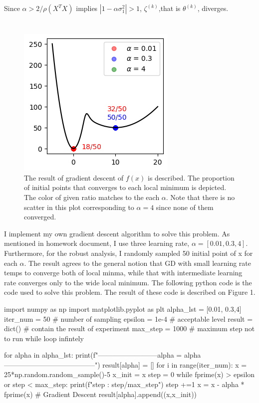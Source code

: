 \documentclass[10pt]{article}
\begin{document}
Since $\alpha > 2/\rho(X^TX)$ implies $\left|1-\alpha \sigma_1^2\right|>1$, $\zeta^{(k)}$,that is $\theta^{(k)}$, diverges.



\section{}
\begin{figure}[!ht]
    \begin{center}
        \includegraphics{Fig1.png}
        \caption{The result of gradient descent of $f(x)$ is described. The proportion of initial points that converges to each local minimum is depicted. The color of given ratio matches to the each $\alpha$. Note that there is no scatter in this plot corresponding to $\alpha = 4$ since none of them converged. }
    \end{center}
\end{figure}

I implement my own gradient descent algorithm to solve this problem. As mentioned in homework document, I use three learning rate, $\alpha = [0.01,0.3,4]$. Furthermore,
for the robust analysis, I randomly sampled 50 initial point of x for each $\alpha$. The result agrees to the general notion that GD with small learning rate temps to converge both of local minma, while that with intermediate learning rate converges only to the wide local minimum. 
The following python code is the code used to solve this problem. The result of these code is described on Figure 1.

\begin{python}
import numpy as np
import matplotlib.pyplot as plt
alpha_lst = [0.01, 0.3,4]
iter_num = 50 # number of sampling
epsilon = 1e-4 # acceptable level
result = dict() # contain the result of experiment
max_step = 1000 # maximum step not to run while loop infintely

for alpha in alpha_lst:
    print(f"--------------------------alpha = {alpha}---------------------------------------")
    result[alpha] = []
    for i in range(iter_num):
        x = 25*np.random.random_sample()-5
        x_init = x
        step = 0
        while fprime(x) > epsilon or step < max_step:
            print(f"step : {step}/{max_step}")
            step +=1
            x = x - alpha * fprime(x) # Gradient Descent
        result[alpha].append((x,x_init))
\end{python}
\end{document}
